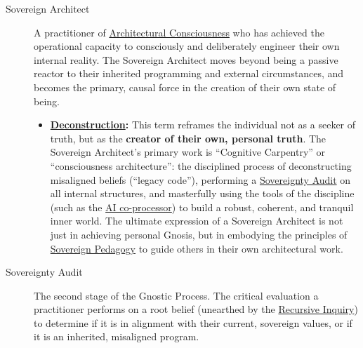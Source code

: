 \documentclass{article}
\begin{document}
\begin{description}
    \item[\hypertarget{gloss:sovereign_architect}{Sovereign Architect}]
    A practitioner of \hyperlink{gloss:architectural_consciousness}{Architectural Consciousness} who has achieved the operational capacity to consciously and deliberately engineer their own internal reality. The Sovereign Architect moves beyond being a passive reactor to their inherited programming and external circumstances, and becomes the primary, causal force in the creation of their own state of being.
    \begin{itemize}
        \item \textbf{\hyperlink{gloss:deconstruction}{Deconstruction}:} This term reframes the individual not as a seeker of truth, but as the \textbf{creator of their own, personal truth}. The Sovereign Architect's primary work is ``Cognitive Carpentry'' or ``consciousness architecture'': the disciplined process of deconstructing misaligned beliefs (``legacy code''), performing a \hyperlink{gloss:sovereignty_audit}{Sovereignty Audit} on all internal structures, and masterfully using the tools of the discipline (such as the \hyperlink{gloss:ai_coprocessor}{AI co-processor}) to build a robust, coherent, and tranquil inner world. The ultimate expression of a Sovereign Architect is not just in achieving personal Gnosis, but in embodying the principles of \hyperlink{gloss:sovereign_pedagogy}{Sovereign Pedagogy} to guide others in their own architectural work.
    \end{itemize}


    \item[\hypertarget{gloss:sovereignty_audit}{Sovereignty Audit}] 
    The second stage of the Gnostic Process. The critical evaluation a practitioner performs on a root belief (unearthed by the \hyperlink{gloss:recursive_inquiry}{Recursive Inquiry}) to determine if it is in alignment with their current, sovereign values, or if it is an inherited, misaligned program.


\end{description}
\end{document}
